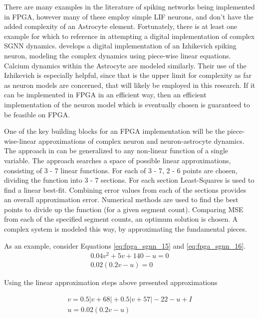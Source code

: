    There are many examples in the literature of spiking networks being
    implemented in FPGA, however many of these employ simple LIF neurons, and
    don't have the added complexity of an Astrocyte element. Fortunately, there
    is at least one example for which to reference in attempting a digital
    implementation of complex SGNN dynamics. \cite{fpga_sgnn} develops a digital
    implementation of an Izhikevich spiking neuron, modeling the complex
    dynamics using piece-wise linear equations. Calcium dynamics within the
    Astrocyte are modeled similarly. Their use of the Izhikevich is especially
    helpful, since that is the upper limit for complexity as far as neuron
    models are concerned, that will likely be employed in this research. If it
    can be implemented in FPGA in an efficient way, then an efficient
    implementation of the neuron model which is eventually chosen is guaranteed
    to be feasible on FPGA.
    
    One of the key building blocks for an FPGA implementation will be the
    piece-wise-linear approximations of complex neuron and neuron-astrocyte
    dynamics. The approach in \cite{fpga_sgnn} can be generalized to any
    non-linear function of a single variable. The approach searches a space of
    possible linear approximations, consisting of 3 - 7 linear functions. For
    each of 3 - 7, 2 - 6 points are chosen, dividing the function into 3 - 7
    sections. For each section Least-Squares is used to find a linear
    best-fit. Combining error values from each of the sections provides an
    overall approximation error. Numerical methods are used to find the best
    points to divide up the function (for a given segment count). Comparing MSE
    from each of the specified segment counts, an optimum solution is chosen. A
    complex system is modeled this way, by approximating the fundamental pieces.
    
    As an example, consider Equations \ref{eq:fpga_sgnn_15} and
    \ref{eq:fpga_sgnn_16}.
    \begin{align}
        0.04v^2 + 5v + 140 - u = 0 \label{eq:fpga_sgnn_15} \\ 0.02(0.2v - u) =
        0 \label{eq:fpga_sgnn_16}
    \end{align}
    
    Using the linear approximation steps above \cite{fpga_sgnn} presented
    approximations
    
    \begin{align*}
        v = 0.5|v+68| + 0.5|v+57| - 22 - u + I \\ u = 0.02(0.2v - u)
    \end{align*}
    

